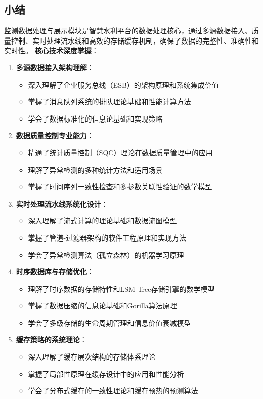 \subsection{小结}\label{ux5c0fux7ed3} 监测数据处理与展示模块是智慧水利平台的数据处理核心，通过多源数据接入、质量控制、实时处理流水线和高效的存储缓存机制，确保了数据的完整性、准确性和实时性。
\textbf{核心技术深度掌握}： \begin{enumerate} \def\labelenumi{\arabic{enumi}.} \tightlist \item \textbf{多源数据接入架构理解}：
\begin{itemize} \tightlist \item 深入理解了企业服务总线（ESB）的架构原理和系统集成价值 \item 掌握了消息队列系统的排队理论基础和性能计算方法 \item 学会了数据标准化的信息论基础和实现策略
\end{itemize} \item \textbf{数据质量控制专业能力}： \begin{itemize} \tightlist \item 精通了统计质量控制（SQC）理论在数据质量管理中的应用 \item
理解了异常检测的多种统计方法和适用场景 \item 掌握了时间序列一致性检查和多参数关联性验证的数学模型 \end{itemize} \item \textbf{实时处理流水线系统化设计}： \begin{itemize}
\tightlist \item 深入理解了流式计算的理论基础和数据流图模型 \item 掌握了管道-过滤器架构的软件工程原理和实现方法 \item 学会了异常检测算法（孤立森林）的机器学习原理 \end{itemize} \item
\textbf{时序数据库与存储优化}： \begin{itemize} \tightlist \item 理解了时序数据的存储特性和LSM-Tree存储引擎的数学模型 \item 掌握了数据压缩的信息论基础和Gorilla算法原理
\item 学会了多级存储的生命周期管理和信息价值衰减模型 \end{itemize} \item \textbf{缓存策略的系统理论}： \begin{itemize} \tightlist \item
深入理解了缓存层次结构的存储体系理论 \item 掌握了局部性原理在缓存设计中的应用和性能分析 \item 学会了分布式缓存的一致性理论和缓存预热的预测算法 \end{itemize} \end{enumerate}
